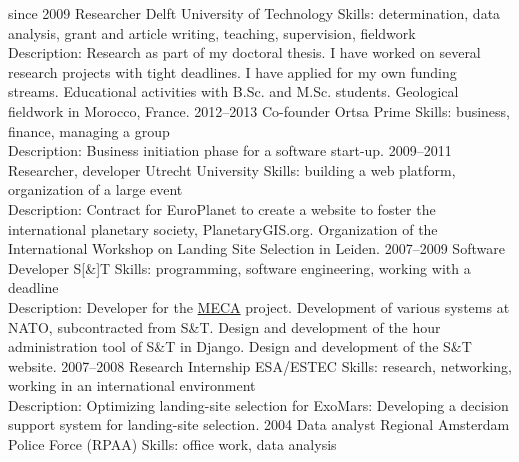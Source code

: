 \documentclass[]{friggeri-cv}
\begin{document}
\begin{entrylist}
  \entry
    {since 2009}
    {Researcher}
    {Delft University of Technology}
    { {Skills:} {determination, data analysis, grant and article writing, teaching, supervision, fieldwork} \\
      {Description:} {Research as part of my doctoral thesis. I have worked on several research projects with tight deadlines. I have applied for my own funding streams. Educational activities with B.Sc. and M.Sc. students. Geological fieldwork in Morocco, France. }}
  \entry
    {2012–2013}
    {Co-founder}
    {Ortsa Prime}
    { {Skills:} { business, finance, managing a group } \\
    {Description:} {Business initiation phase for a software start-up. }}
  \entry
    {2009–2011}
    {Researcher, developer}
    {Utrecht University}
    { {Skills:} { building a web platform, organization of a large event } \\
    {Description:} {Contract for EuroPlanet to create a website to foster the international planetary society, PlanetaryGIS.org. 
    Organization of the International Workshop on Landing Site Selection in Leiden.}}
  \entry
    {2007–2009}
    {Software Developer}
    {S[\&]T}
    { {Skills:} { programming, software engineering, working with a deadline } \\
    {Description:} { Developer for the \href{http://crewassistant.com}{MECA} project. 
            Development of various systems at NATO, subcontracted from S\&T. 
            Design and development of the hour administration tool of S\&T in Django. 
            Design and development of the S\&T website. }}
  \entry
    {2007–2008}
    {Research Internship}
    {ESA/ESTEC}
    { {Skills:} { research, networking, working in an international environment } \\
    {Description:} {Optimizing landing-site selection for ExoMars: Developing a decision support system for landing-site selection. }}
  \entry
    {2004}
    {Data analyst}
    {Regional Amsterdam Police Force (RPAA)}
    { {Skills:} { office work, data analysis } \\
}
\end{entrylist}
\end{document}
